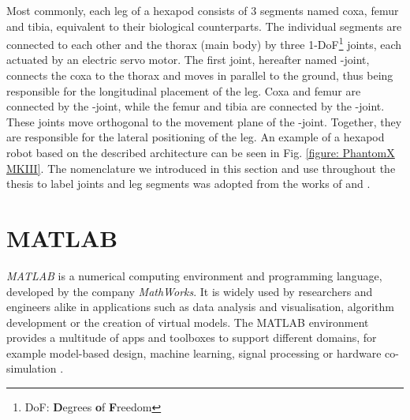 Most commonly, each leg of a hexapod consists of 3 segments named coxa, femur and tibia, equivalent to their biological counterparts.
The individual segments are connected to each other and the thorax (main body) by three 1-DoF\footnote{DoF: \textbf{D}egrees \textbf{o}f \textbf{F}reedom} joints, each actuated by an electric servo motor.
The first joint, hereafter named \textalpha-joint, connects the coxa to the thorax and moves in parallel to the ground, thus being responsible for the longitudinal placement of the leg.
Coxa and femur are connected by the \textbeta-joint, while the femur and tibia are connected by the \textgamma-joint. 
These joints move orthogonal to the movement plane of the \textalpha-joint. Together, they are responsible for the lateral positioning of the leg.
An example of a hexapod robot based on the described architecture can be seen in Fig. \ref{figure: PhantomX MKIII}.
The nomenclature we introduced in this section and use throughout the thesis to label joints and leg segments was adopted from the works of 
\cite{schilling2013walknet} and \cite{HeterarchicalArchitectureSchilling}.


\section{MATLAB}
\textit{MATLAB\textsuperscript{\textregistered}} is a numerical computing environment and programming language, developed by the company \textit{MathWorks\textsuperscript{\textregistered}}.
It is widely used by researchers and engineers alike in applications such as data analysis and visualisation, algorithm development or the creation of virtual models.
The MATLAB environment provides a multitude of apps and toolboxes to support different domains, for example model-based design, machine learning, signal processing or hardware co-simulation \parencite{MATLAB}.

